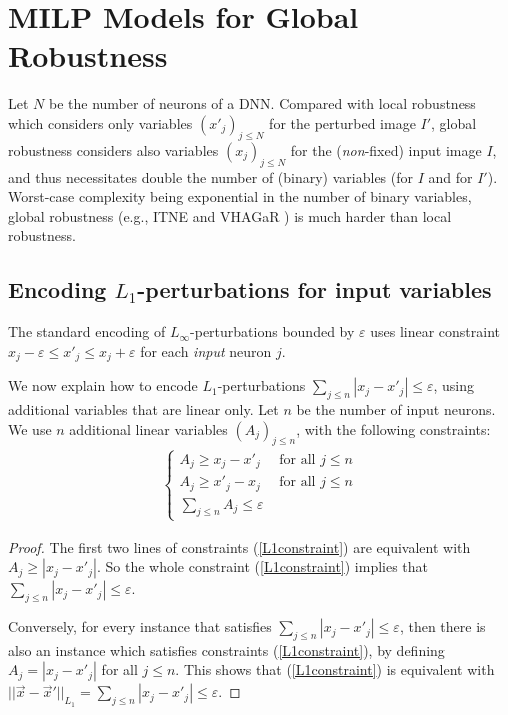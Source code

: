 	\section{MILP Models for Global Robustness}

Let $N$ be the number of neurons of a DNN. Compared with local robustness which considers only variables $(x'_j)_{j \leq N}$ for the perturbed image $I'$, global robustness considers also variables $(x_j)_{j \leq N}$ for the ({\em non}-fixed) input image $I$, and thus necessitates double the number of (binary) variables (for $I$ and for $I'$). Worst-case complexity being exponential in the number of binary variables, global robustness (e.g., ITNE and VHAGaR \cite{ITNE,vhagar}) is much harder than local robustness.

\subsection{Encoding $L_1$-perturbations for input variables}
\label{s.L1}

The standard encoding of $L_\infty$-perturbations bounded by $\varepsilon$ uses
linear constraint $x_j-\varepsilon \leq x'_j \leq x_j+\varepsilon$ 
for each {\em input} neuron $j$. 

\smallskip

We now explain how to encode $L_1$-perturbations 
$\sum_{j\leq n} |x_j-x'_j| \leq \varepsilon$, using additional variables that are linear only. Let $n$ be the number of input neurons. 
We use $n$ additional linear variables $(A_j)_{j \leq n}$, with the following  constraints:
\begin{align}\label{L1constraint}\begin{cases}
	A_j \geq x_j - x'_j &\text{ for all }j \leq n\\ 
	A_j \geq x'_j - x_j &\text{ for all }j \leq n\\
	\sum_{j\leq n} A_j \leq \varepsilon	&\end{cases}
\end{align}

\begin{proof}

The first two lines of constraints (\ref{L1constraint}) are equivalent with $A_j \geq |x_j - x'_j|$. 
So the whole constraint (\ref{L1constraint}) 
implies that $\sum_{j\leq n} |x_j - x'_j| \leq \varepsilon$.

Conversely, for every instance that satisfies $\sum_{j\leq n} |x_j - x'_j| \leq \varepsilon$, then there is also an instance which satisfies constraints (\ref{L1constraint}),  by defining $A_j = |x_j - x'_j|$ for all $j \leq n$.
%
This shows that (\ref{L1constraint}) is equivalent with 
$||\vec{x} - \vec{x}'||_{L_1} = \sum_{j\leq n} |x_j-x'_j| \leq \varepsilon$.
\end{proof}


